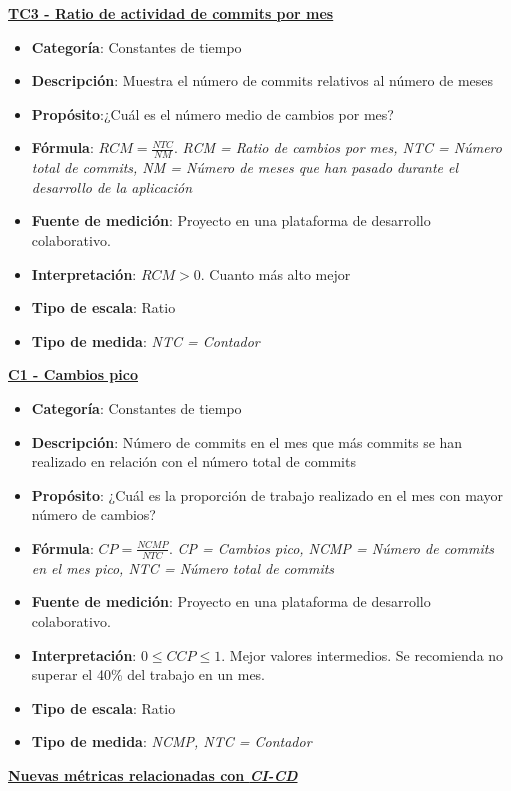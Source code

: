 \textbf{\underline{TC3 - Ratio de actividad de commits por mes}}

\begin{itemize}
	\item \textbf{Categoría}: Constantes de tiempo
	\item \textbf{Descripción}: Muestra el número de commits relativos al número de meses
	\item \textbf{Propósito}:¿Cuál es el número medio de cambios por mes?
	\item \textbf{Fórmula}: $RCM = \frac{NTC}{NM}$. \textit{RCM = Ratio de cambios por mes, NTC = Número total de commits, NM = Número de meses que han pasado durante el desarrollo de la aplicación}
	\item \textbf{Fuente de medición}: Proyecto en una plataforma de desarrollo colaborativo.
	\item \textbf{Interpretación}: $RCM > 0$. Cuanto más alto mejor
	\item \textbf{Tipo de escala}: Ratio
	\item \textbf{Tipo de medida}: \textit{NTC = Contador}
\end{itemize}

\textbf{\underline{C1 - Cambios pico}}

\begin{itemize}
	\item \textbf{Categoría}: Constantes de tiempo
	\item \textbf{Descripción}: Número de commits en el mes que más commits se han realizado en relación con el número total de commits
	\item \textbf{Propósito}: ¿Cuál es la proporción de trabajo realizado en el mes con mayor número de cambios?
	\item \textbf{Fórmula}: $CP = \frac{NCMP}{NTC}$. \textit{CP = Cambios pico, NCMP = Número de commits en el mes pico, NTC = Número total de commits}
	\item \textbf{Fuente de medición}: Proyecto en una plataforma de desarrollo colaborativo.
	\item \textbf{Interpretación}: $0 \leq CCP \leq 1$. Mejor valores intermedios. Se recomienda no superar el 40\% del trabajo en un mes.
	\item \textbf{Tipo de escala}: Ratio
	\item \textbf{Tipo de medida}: \textit{NCMP, NTC = Contador}
\end{itemize}

\begin{large}
\textbf{\underline{Nuevas métricas relacionadas con \textit{CI-CD}}}
\linebreak
\end{large}

